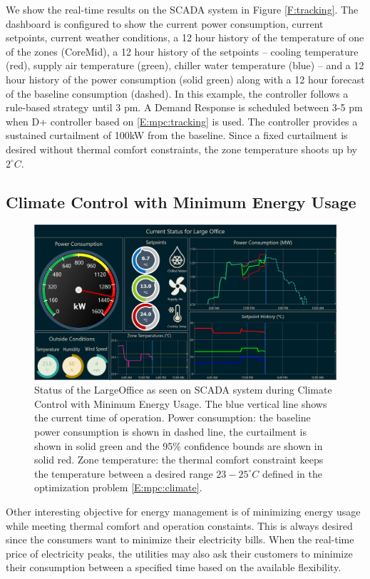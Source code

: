 We show the real-time results on the SCADA system in Figure \ref{F:tracking}.
The dashboard is configured to show the current power consumption, current setpoints, current weather conditions, a 12 hour history of the temperature of one of the zones (CoreMid), a 12 hour history of the setpoints -- cooling temperature (red), supply air temperature (green), chiller water temperature (blue) -- and a 12 hour history of the power consumption (solid green) along with a 12 hour forecast of the baseline consumption (dashed).
In this example, the controller follows a rule-based strategy until 3 pm.
A Demand Response is scheduled between 3-5 pm when D+ controller based on \eqref{E:mpc:tracking} is used.
The controller provides a sustained curtailment of 100kW from the baseline.
Since a fixed curtailment is desired without thermal comfort constraints, the zone temperature shoots up by \(2^\circ C\).

\subsection{Climate Control with Minimum Energy Usage}

\begin{figure}[t]
  \centering
  \includegraphics[width=0.9\linewidth]{images/Dashboard-DR.png}
  \caption{Status of the LargeOffice as seen on SCADA system during Climate Control with Minimum Energy Usage. The blue vertical line shows the current time of operation. Power consumption: the baseline power consumption is shown in dashed line, the curtailment is shown in solid green and the 95\% confidence bounds are shown in solid red. Zone temperature: the thermal comfort constraint keeps the temperature between a desired range \(23-25^\circ C\) defined in the optimization problem \eqref{E:mpc:climate}.}
  \label{F:climate}
\end{figure}

Other interesting objective for energy management is of minimizing energy usage while meeting thermal comfort and operation constaints. 
This is always desired since the consumers want to minimize their electricity bills.
When the real-time price of electricity peaks, the utilities may also ask their customers to minimize their consumption between a specified time based on the available flexibility.

